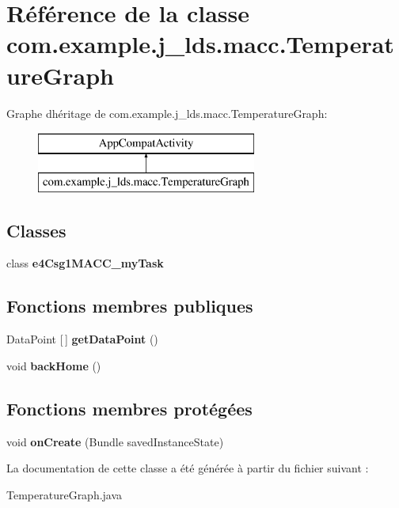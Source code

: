 \hypertarget{a00052}{}\section{Référence de la classe com.\+example.\+j\+\_\+lds.\+macc.\+Temperature\+Graph}
\label{a00052}
Graphe d\textquotesingle{}héritage de com.\+example.\+j\+\_\+lds.\+macc.\+Temperature\+Graph\+:\begin{figure}[H]
\begin{center}
\leavevmode
\includegraphics[height=2.000000cm]{a00052}
\end{center}
\end{figure}
\subsection*{Classes}
\begin{DoxyCompactItemize}
\item 
class {\bfseries e4\+Csg1\+M\+A\+C\+C\+\_\+my\+Task}
\end{DoxyCompactItemize}
\subsection*{Fonctions membres publiques}
\begin{DoxyCompactItemize}
\item 
\mbox{\label{a00052_aecd489a18fb620f05878526d1b903578}} 
Data\+Point \mbox{[}$\,$\mbox{]} {\bfseries get\+Data\+Point} ()
\item 
\mbox{\label{a00052_a82f17820dd387201db287d74bf1968b7}} 
void {\bfseries back\+Home} ()
\end{DoxyCompactItemize}
\subsection*{Fonctions membres protégées}
\begin{DoxyCompactItemize}
\item 
\mbox{\label{a00052_a725657d4ff9d5c93aad83343b01f304d}} 
void {\bfseries on\+Create} (Bundle saved\+Instance\+State)
\end{DoxyCompactItemize}


La documentation de cette classe a été générée à partir du fichier suivant \+:\begin{DoxyCompactItemize}
\item 
Temperature\+Graph.\+java\end{DoxyCompactItemize}
